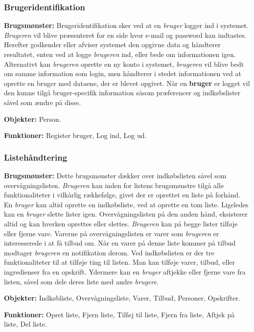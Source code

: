 \subsubsection*{Brugeridentifikation}
\textbf{Brugsmønster:} Brugeridentifikation sker ved at en \textit{bruger} logger ind i systemet. 
\textit{Brugeren} vil blive præsenteret for en side hvor e-mail og password kan indtastes.
Herefter godkender eller afviser systemet den opgivne data og håndterer resultatet, enten ved at logge \textit{brugeren} ind, eller bede om informationen igen.
Alternativt kan \textit{brugeren} oprette en ny konto i systemet, \textit{brugeren} vil blive bedt om samme information som login, men håndterer i stedet informationen ved at oprette en bruger med dataene, der er blevet opgivet.
Når en \textbf{bruger} er logget vil den kunne tilgå bruger-specifik information såsom præferencer og indkøbslister såvel som ændre på disse.

\textbf{Objekter:} Person.

\textbf{Funktioner:} Register bruger, Log ind, Log ud.

\subsubsection*{Listehåndtering}
\textbf{Brugsmønster:} Dette brugsmønster dækker over indkøbslisten såvel som overvågningslisten. 
\textit{Brugeren} kan inden for listens brugsmønstre tilgå alle funktionaliteter i vilkårlig rækkefølge, givet der er oprettet en liste på forhånd. 
En \textit{bruger} kan altid oprette en indkøbsliste, ved at oprette en tom liste.
Ligeledes kan en \textit{bruger} slette lister igen.
Overvågningslisten på den anden hånd, eksisterer altid og kan hverken oprettes eller slettes.
\textit{Brugeren} kan på begge lister tilføje eller fjerne vare.
Varerne på overvågningslisten er varer som \textit{brugeren} er interesserede i at få tilbud om. 
Når en varer på denne liste kommer på tilbud modtager \textit{brugeren} en notifikation derom.
Ved indkøbslisten er der tre funktionaliteter til at tilføje ting til listen.
Man kan tilføje varer, tilbud, eller ingredienser fra en opskrift.
Ydermere kan en \textit{bruger} aftjekke eller fjerne vare fra listen, såvel som dele deres liste med andre \textit{brugere}.

\textbf{Objekter:} Indkøbliste, Overvågningsliste, Varer, Tilbud, Personer, Opskrifter.

\textbf{Funktioner:} Opret liste, Fjern liste, Tilføj til liste, Fjern fra liste, Aftjek på liste, Del liste.

